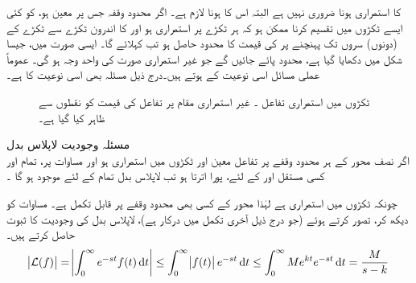  کا استمراری  ہونا ضروری نہیں ہے البتہ اس کا  ہونا لازم ہے۔  اگر محدود وقفہ  جس پر  معین ہو، کو کئی ایسے ٹکڑوں میں تقسیم کرنا ممکن ہو کہ ہر ٹکڑے پر  استمراری ہو اور  کا اندرون ٹکڑے سے ٹکڑے کے (دونوں) سروں تک پہنچنے پر   کی قیمت کا  محدود حاصل ہو تب   کہلائے گا۔ ایسی صورت میں، جیسا شکل  میں دکھایا گیا ہے، محدود  پائے جائیں گے جو غیر استمراری صورت کی واحد وجہ ہو گی۔ عموماً عملی مسائل اسی نوعیت کے ہوتے ہیں۔درج ذیل مسئلہ بھی اسی نوعیت کا ہے۔ 
\begin{figure}
\centering
{}
\caption{ٹکڑوں میں استمراری تفاعل ۔ غیر استمراری مقام پر تفاعل کی قیمت کو نقطوں سے ظاہر کیا گیا ہے۔}
\label{شکل_لاپلاس_ٹکڑوں_استمراری}
\end{figure}

\quad مسئلہ وجودیت لاپلاس بدل\\
اگر نصف محور  کے ہر محدود وقفے پر تفاعل  معین اور ٹکڑوں میں استمراری ہو اور مساوات  پر، 
تمام  اور کسی مستقل  اور  کے لئے،  پورا اترتا ہو تب لاپلاس بدل  تمام  کے لئے موجود ہو گا ۔ 

چونکہ  ٹکڑوں میں استمراری ہے لہٰذا  محور کے کسی بھی محدود وقفے پر  قابل تکمل ہے۔ مساوات  کو دیکھ کر،  تصور کرتے ہوئے (جو درج ذیل آخری تکمل میں درکار ہے)، لاپلاس بدل کی وجودیت کا ثبوت حاصل کرتے ہیں۔
\begin{align*}
\abs{\Laplace(f)} = \abs{\int_{0}^{\infty} e^{-st}f(t)\dif t}\le \int_{0}^{\infty} \abs{f(t)}e^{-st}\dif t\le \int_{0}^{\infty} Me^{kt}e^{-st}\dif t=\frac{M}{s-k}
\end{align*}

